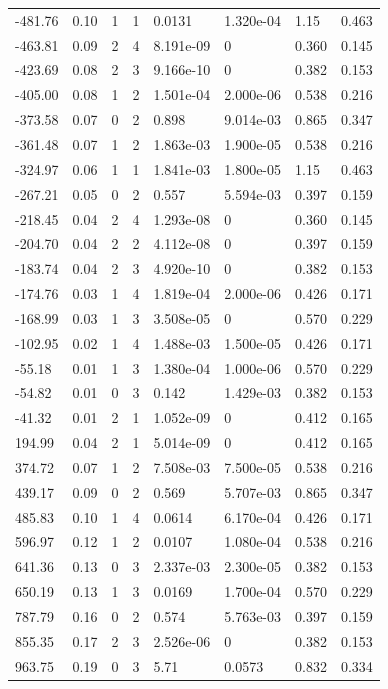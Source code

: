\documentclass[preview]{standalone}
\begin{document}
{{\begin{tabular}{L{1.2cm}C{1.2cm} C{0.3cm}C{0.5cm} C{1.4cm}C{1.4cm} C{1.4cm}C{1.4cm}}
  -481.76  &  0.10  & 1     &  1 &  0.0131  & 1.320e-04  & 1.15 &  0.463   \\ 
  -463.81  &  0.09  & 2     &  4 &  8.191e-09  & 0  & 0.360 &  0.145   \\ 
  -423.69  &  0.08  & 2     &  3 &  9.166e-10  & 0  & 0.382 &  0.153   \\ 
  -405.00  &  0.08  & 1     &  2 &  1.501e-04  & 2.000e-06  & 0.538 &  0.216   \\ 
  -373.58  &  0.07  & 0     &  2 &  0.898  & 9.014e-03  & 0.865 &  0.347   \\ 
  -361.48  &  0.07  & 1     &  2 &  1.863e-03  & 1.900e-05  & 0.538 &  0.216   \\ 
  -324.97  &  0.06  & 1     &  1 &  1.841e-03  & 1.800e-05  & 1.15 &  0.463   \\ 
  -267.21  &  0.05  & 0     &  2 &  0.557  & 5.594e-03  & 0.397 &  0.159   \\ 
  -218.45  &  0.04  & 2     &  4 &  1.293e-08  & 0  & 0.360 &  0.145   \\ 
  -204.70  &  0.04  & 2     &  2 &  4.112e-08  & 0  & 0.397 &  0.159   \\ 
  -183.74  &  0.04  & 2     &  3 &  4.920e-10  & 0  & 0.382 &  0.153   \\ 
  -174.76  &  0.03  & 1     &  4 &  1.819e-04  & 2.000e-06  & 0.426 &  0.171   \\ 
  -168.99  &  0.03  & 1     &  3 &  3.508e-05  & 0  & 0.570 &  0.229   \\ 
  -102.95  &  0.02  & 1     &  4 &  1.488e-03  & 1.500e-05  & 0.426 &  0.171   \\ 
  -55.18  &  0.01  & 1     &  3 &  1.380e-04  & 1.000e-06  & 0.570 &  0.229   \\ 
  -54.82  &  0.01  & 0     &  3 &  0.142  & 1.429e-03  & 0.382 &  0.153   \\ 
  -41.32  &  0.01  & 2     &  1 &  1.052e-09  & 0  & 0.412 &  0.165   \\ 
  194.99  &  0.04  & 2     &  1 &  5.014e-09  & 0  & 0.412 &  0.165   \\ 
  374.72  &  0.07  & 1     &  2 &  7.508e-03  & 7.500e-05  & 0.538 &  0.216   \\ 
  439.17  &  0.09  & 0     &  2 &  0.569  & 5.707e-03  & 0.865 &  0.347   \\ 
  485.83  &  0.10  & 1     &  4 &  0.0614  & 6.170e-04  & 0.426 &  0.171   \\ 
  596.97  &  0.12  & 1     &  2 &  0.0107  & 1.080e-04  & 0.538 &  0.216   \\ 
  641.36  &  0.13  & 0     &  3 &  2.337e-03  & 2.300e-05  & 0.382 &  0.153   \\ 
  650.19  &  0.13  & 1     &  3 &  0.0169  & 1.700e-04  & 0.570 &  0.229   \\ 
  787.79  &  0.16  & 0     &  2 &  0.574  & 5.763e-03  & 0.397 &  0.159   \\ 
  855.35  &  0.17  & 2     &  3 &  2.526e-06  & 0  & 0.382 &  0.153   \\ 
  963.75  &  0.19  & 0     &  3 &  5.71  & 0.0573  & 0.832 &  0.334   \\ 
\hline 
\end{tabular} 

}}
\end{document}
